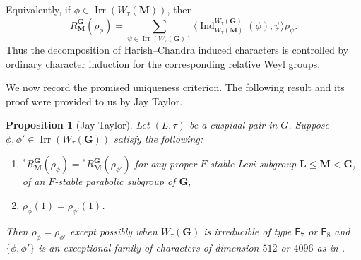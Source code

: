 \documentclass{amsart}
\theoremstyle{plain}
\numberwithin{equation}{section}
\newtheorem{proposition}[theorem]{Proposition}
\theoremstyle{definition}
\newcommand{\Ind}{\operatorname{Ind}}
\newcommand{\Irr}{\operatorname{Irr}}
\newcommand{\bG}{\mathbf{G}}
\newcommand{\bL}{\mathbf{L}}
\newcommand{\bM}{\mathbf{M}}
\begin{document}
Equivalently, if \(\phi\in\Irr(W_\tau(\bM))\), then
\[
R_{\bM}^{\bG}(\rho_\phi)
=
\sum_{\psi\in\Irr(W_\tau(\bG))}
\big\langle
\Ind_{W_{\tau}(\bM)}^{W_{\tau}(\bG)}(\phi),\psi
\big\rangle
\rho_\psi .
\]
Thus the decomposition of Harish--Chandra induced characters is controlled by
ordinary character induction for the corresponding relative Weyl groups.

We now record the promised uniqueness criterion.  The following result and its
proof were provided to us by Jay Taylor.

\begin{proposition}[Jay Taylor]\label{prop:unique-HC-char}
Let $(L,\tau)$ be a cuspidal pair in $G$.
Suppose $\phi,\phi' \in \Irr(W_{\tau}(\bG))$ satisfy the following:

\begin{enumerate}[label={\normalfont(\arabic*)}]
	\item ${}^*R_{\bM}^{\bG}(\rho_{\phi}) = {}^*R_{\bM}^{\bG}(\rho_{\phi'})$ for any proper $F$-stable Levi subgroup $\bL \leqslant \bM < \bG$, of an $F$-stable parabolic subgroup of $\bG$,
	\item $\rho_{\phi}(1) = \rho_{\phi'}(1)$.
\end{enumerate}

Then $\rho_{\phi} = \rho_{\phi'}$ except possibly when $W_{\tau}(\bG)$ is irreducible of type $\mathsf{E}_7$ or $\mathsf{E}_8$ and $\{\phi,\phi'\}$ is an exceptional family of characters of dimension $512$ or $4096$ as in \cite[6.3.6]{geck-pfeiffer:2000:characters-of-finite-coxeter-groups}.
\end{proposition}
\end{document}
